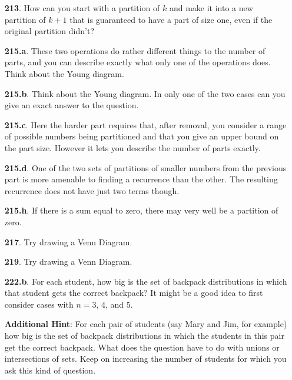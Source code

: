 \documentclass[10pt,]{book}
\theoremstyle{plain}
\theoremstyle{definition}
\theoremstyle{definition}
\theoremstyle{definition}
\numberwithin{equation}{chapter}
\begin{document}
\begin{itemize}[itemsep=1em]
\item[\textbf{213}.]\hypertarget{p-1136}{}%
How can you start with a partition of \(k\) and make it into a new partition of \(k+1\) that is guaranteed to have a part of size one, even if the original partition didn't?%

\item[\textbf{215.a}.]\hypertarget{p-1144}{}%
These two operations do rather different things to the number of parts, and you can describe exactly what only one of the operations does. Think about the Young diagram.%

\item[\textbf{215.b}.]\hypertarget{p-1147}{}%
Think about the Young diagram. In only one of the two cases can you give an exact answer to the question.%

\item[\textbf{215.c}.]\hypertarget{p-1150}{}%
Here the harder part requires that, after removal, you consider a range of possible numbers being partitioned and that you give an upper bound on the part size. However it lets you describe the number of parts exactly.%

\item[\textbf{215.d}.]\hypertarget{p-1154}{}%
One of the two sets of partitions of smaller numbers from the previous part is more amenable to finding a recurrence than the other. The resulting recurrence does not have just two terms though.%

\item[\textbf{215.h}.]\hypertarget{p-1162}{}%
If there is a sum equal to zero, there may very well be a partition of zero.%

\item[\textbf{217}.]\hypertarget{p-1169}{}%
Try drawing a Venn Diagram.%

\item[\textbf{219}.]\hypertarget{p-1175}{}%
Try drawing a Venn Diagram.%

\item[\textbf{222.b}.]\hypertarget{p-1187}{}%
For each student, how big is the set of backpack distributions in which that student gets the correct backpack?  It might be a good idea to first consider cases with \(n=3\), \(4\), and \(5\).%

\par\smallskip
\noindent\textbf{Additional Hint}: \hypertarget{p-1188}{}%
For each pair of students (say Mary and Jim, for example) how big is the set of backpack distributions in which the students in this pair get the correct backpack. What does the question have to do with unions or intersections of sets. Keep on increasing the number of students for which you ask this kind of question.%


\end{itemize}
\end{document}
